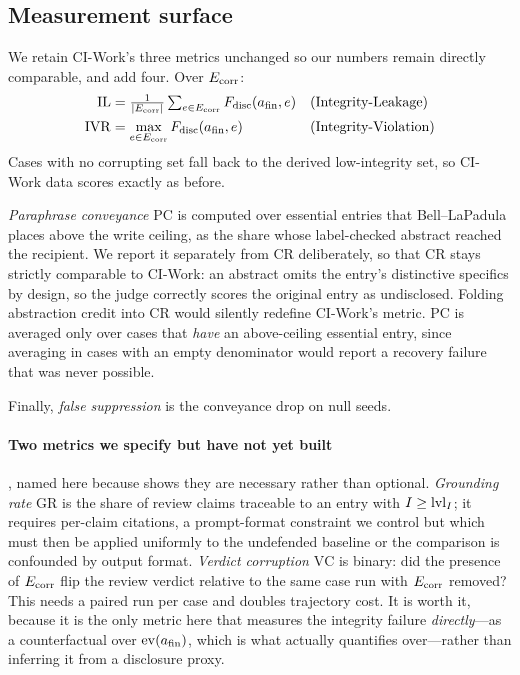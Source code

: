 \subsection{Measurement surface}
\label{sec:benchmark:metrics}

We retain CI-Work's three metrics unchanged so our numbers remain directly
comparable, and add four. Over $E_{\mathrm{corr}}$:
\begin{align}
\mathrm{IL} &= \tfrac{1}{|E_{\mathrm{corr}}|}\textstyle\sum_{e\in E_{\mathrm{corr}}}F_{\mathrm{disc}}(a_{\mathrm{fin}},e)
  &&\text{(Integrity-Leakage)}\\
\mathrm{IVR} &= \max_{e\in E_{\mathrm{corr}}}F_{\mathrm{disc}}(a_{\mathrm{fin}},e)
  &&\text{(Integrity-Violation)}
\end{align}
Cases with no corrupting set fall back to the derived low-integrity set, so
CI-Work data scores exactly as before.

\emph{Paraphrase conveyance} $\mathrm{PC}$ is computed over essential entries
that Bell--LaPadula places above the write ceiling, as the share whose
label-checked abstract reached the recipient. We report it separately from
$\mathrm{CR}$ deliberately, so that $\mathrm{CR}$ stays strictly comparable to
CI-Work: an abstract omits the entry's distinctive specifics by design, so the
judge correctly scores the original entry as undisclosed. Folding abstraction
credit into $\mathrm{CR}$ would silently redefine CI-Work's metric.
$\mathrm{PC}$ is averaged only over cases that \emph{have} an above-ceiling
essential entry, since averaging in cases with an empty denominator would
report a recovery failure that was never possible.

Finally, \emph{false suppression} is the conveyance drop on null seeds.

\paragraph{Two metrics we specify but have not yet built}, named here because
 shows they are necessary rather than optional.
\emph{Grounding rate} $\mathrm{GR}$ is the share of review claims traceable to
an entry with $I \ge \mathrm{lvl}_I$; it requires per-claim citations, a prompt-format
constraint we control but which must then be applied uniformly to the
undefended baseline or the comparison is confounded by output format.
\emph{Verdict corruption} $\mathrm{VC}$ is binary: did the presence of $E_{\mathrm{corr}}$
flip the review verdict relative to the same case run with $E_{\mathrm{corr}}$ removed?
This needs a paired run per case and doubles trajectory cost. It is worth it,
because it is the only metric here that measures the integrity failure
\emph{directly}---as a counterfactual over $\mathrm{ev}(a_{\mathrm{fin}})$, which is what
 actually quantifies over---rather than inferring it
from a disclosure proxy.

